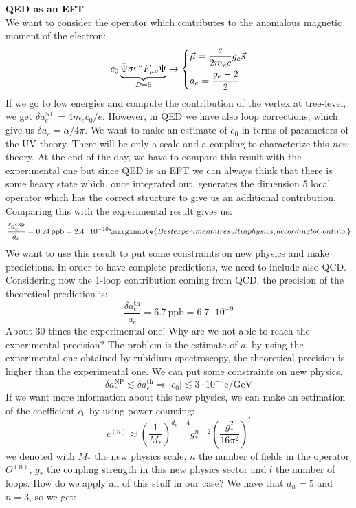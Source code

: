 \documentclass[../main.tex]{subfiles}
\begin{document}
\begin{example}\textbf{QED as an EFT}\\
We want to consider the operator which contributes to the anomalous magnetic moment of the electron:
\[
c_0\underbrace{\Bar{\Psi}\sigma^{\mu\nu}F_{\mu\nu}\Psi}_{D=5}\to\left\{\begin{aligned}
&\Vec{\mu}=\frac{e}{2m_ec}g_e\Vec{s}\\
&a_e=\frac{g_e-2}{2}
\end{aligned}\right.
\]
If we go to low energies and compute the contribution of the vertex at tree-level, we get $\delta a_e^{\text{NP}}=4m_ec_0/e$. However, in QED we have also loop corrections, which give us $\delta a_e=\alpha/4\pi$. We want to make an estimate of $c_0$ in terms of parameters of the UV theory. There will be only a scale and a coupling to characterize this \textit{new} theory. At the end of the day, we have to compare this result with the experimental one but since QED is an EFT we can always think that there is some heavy state which, once integrated out, generates the dimension 5 local operator which has the correct structure to give us an additional contribution. Comparing this with the experimental result gives us:
\[
\frac{\delta a_e^{\text{exp}}}{a_e}=0.24\,\text{ppb}=2.4\cdot10^{-10}\marginnote{Best experimental result in physics, according to Contino.}
\]
We want to use this result to put some constraints on new physics and make predictions. In order to have complete predictions, we need to include also QCD. Considering now the 1-loop contribution coming from QCD, the precision of the theoretical prediction is:
\[
\frac{\delta a_e^{\text{th}}}{a_e}=6.7\,\text{ppb}=6.7\cdot10^{-9}
\]
About 30 times the experimental one! Why are we not able to reach the experimental precision? The problem is the estimate of $a$: by using the experimental one obtained by rubidium spectroscopy, the theoretical precision is higher than the experimental one. We can put some constraints on new physics.
\[
\delta a_e^{\text{NP}}\lesssim\delta a_e^{\text{th}}\Rightarrow|c_0|\lesssim3\cdot10^{-9} \text{e/GeV}
\]
If we want more information about this new physics, we can make an estimation of the coefficient $c_0$ by using power counting:
\[
c^{(n)}\approx\left(\frac{1}{M_*}\right)^{d_n-4}g_*^{n-2}\left(\frac{g_*^2}{16\pi^2}\right)^l
\]
we denoted with $M_*$ the new physics scale, $n$ the number of fields in the operator $O^{(n)}$, $g_*$ the coupling strength in this new physics sector and $l$ the number of loops. How do we apply all of this stuff in our case? We have that $d_n=5$ and $n=3$, so we get:

\end{example}
\end{document}

